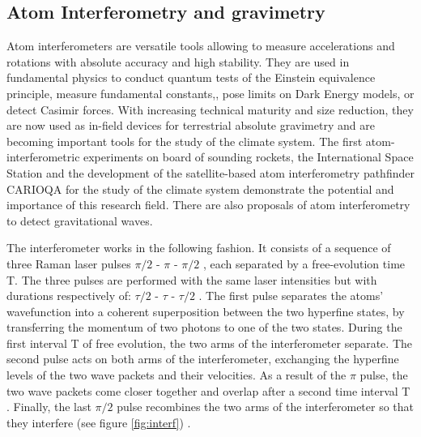 \documentclass[english, a4paper, 11pt]{article}
\begin{document}
\subsection{Atom Interferometry and gravimetry}
Atom interferometers are versatile tools allowing to measure accelerations and rotations with absolute accuracy and high stability\cite{geiger2020highaccuracy}. They are used in fundamental physics to conduct quantum tests of the Einstein equivalence principle\cite{asenbaum2020atom}, measure fundamental constants\cite{rosi2014precision},\cite{morel2020determination}, pose limits on Dark Energy models\cite{elder2016chameleon}, or detect Casimir forces. With increasing technical maturity and size reduction, they are now used as in-field devices for terrestrial absolute gravimetry\cite{menoret2018gravity} and are becoming important tools for the study of the climate system. The first atom-interferometric experiments on board of sounding rockets\cite{becker2018space}, the International Space Station\cite{aveline2020observation} and the development of the satellite-based atom interferometry pathfinder CARIOQA\cite{lévèque2022carioqa} for the study of the climate system demonstrate the potential and importance of this research field. There are also proposals of atom interferometry to detect gravitational waves\cite{badurina2022prospective}.

The interferometer works in the following fashion. It consists of a sequence of three Raman laser pulses $\pi/2$ - $\pi$ - $\pi/2$ , each separated by a free-evolution time T. The three pulses are performed with the same laser intensities but with durations respectively of: $\tau/2$ - $\tau$ - $\tau/2$ . The first pulse separates the atoms' wavefunction into a coherent superposition between the two hyperfine states, by transferring the momentum of two photons to one of the two states. During the first interval T of free evolution, the two arms of the interferometer separate. The second pulse acts on both arms of the interferometer, exchanging the hyperfine levels of the two wave packets and their velocities. As a result of the $\pi$ pulse, the two wave packets come closer together and overlap after a second time interval T . Finally, the last $\pi/2$ pulse recombines the two arms of the interferometer so that they interfere (see figure \ref{fig:interf})
\cite{cheinet2006conception}.
\end{document}
